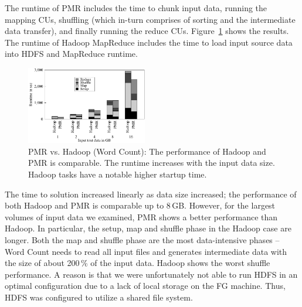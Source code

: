 \documentclass{sig-alternate}
\newcommand{\jhanote}[1]{ {\textcolor{red} { ***SJ: #1 }}}
\newcommand{\alnote}[1]{ {\textcolor{blue} { ***andreL: #1 }}}
\newcommand{\pnote}[1]{ {\textcolor{magenta} { ***pradeep: #1 }}}
\newcommand{\alnote}[1]{}
\newcommand{\pnote}[1]{}
\newcommand{\jhanote}[1]{}
\newcommand{\upp}{\vspace*{-0.5em}}
\begin{document}
The runtime of PMR includes the time to chunk input data, running the
mapping CUs, shuffling (which in-turn comprises of sorting and the
intermediate data transfer), and finally running the reduce CUs.
Figure~\ref{fig:figures_wc_pmr_hmr} shows the results. The runtime of
Hadoop MapReduce includes the time to load input source data into HDFS and
MapReduce runtime.

\begin{figure}[ht]
	\centering
		\includegraphics[width=0.47\textwidth]{figures/wc_pmr_hmr.pdf}
                \caption{PMR vs. Hadoop (Word Count): The performance
                  of Hadoop and PMR is comparable. The runtime 
                  increases with the input data size. Hadoop tasks
                  have a notable higher startup time.\upp}
\label{fig:figures_wc_pmr_hmr}
\end{figure}		
	
The time to solution increased linearly as data size increased; the performance
of both Hadoop and PMR is comparable up to 8\,GB. However, for the largest
volumes of input data we examined, PMR shows a better performance than Hadoop.
In particular, the setup, map and shuffle phase in the Hadoop case are longer.
Both the map and shuffle phase are the most data-intensive phases -- Word Count
needs to read all input files and generates intermediate data with the size of
about 200\,\% of the input data. Hadoop shows the worst shuffle performance. A
reason is that we were unfortunately not able to run HDFS in an optimal
configuration due to a lack of local storage on the FG machine. Thus, HDFS was
configured to utilize a shared file system.
  

\end{document}
